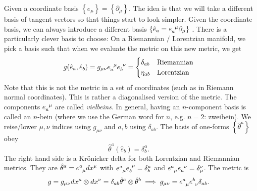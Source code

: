 Given a coordinate basis $\left\{ e_{\mu} \right\} = \left\{ \partial_{\mu} \right\}$.
The idea is that we will take a different basis of tangent vectors so that things start to look simpler.
Given the coordinate basis, we can always introduce a different basis $\left\{ \hat e_a = e \indices{_a^{\mu}} \partial_{\mu} \right\}$ .
There is a particularly clever basis to choose:
On a Riemannian / Lorentzian manifold, we pick a basis such that when we evaluate the metric on this new metric, we get
\begin{equation}
  g(\hat e_a, \hat e_b) = g_{\mu\nu} e\indices{_a^{\mu}} e \indices{_b^{\nu}} =
  \begin{cases}
    \delta_{ab} & \text{Riemannian} \\
    \eta_{ab} & \text{Lorentzian}
  \end{cases}
\end{equation}
Note that this is not the metric in a set of coordinates (such as in Riemann normal coordinates). This is rather a diagonalised version of the metric.
The components $e \indices{_a^{\mu}}$ are called \emph{vielbeins}.
In general, having an $n$-component basis is called an $n$-bein (where we use the German word for $n$, e.g. $n=2$: zweibein).
We reise/lower $\mu, \nu$ indices using $g_{\mu\nu}$ and $a, b$ using $\delta_{ab}$.
The basis of one-forms $\left\{ \hat\theta^a \right\}$ obey 
\begin{equation}
  \hat \theta^a (\hat e_b) = \delta^a_b.
\end{equation}
The right hand side is a Krönicker delta for both Lorentzian and Riemannian metrics.
They are $\hat \theta^a = e \indices{^a_{\mu}} dx^{\mu}$ with $e \indices{^a_{\mu}} e \indices{_b^{\mu}} = \delta^a_b$ and $e \indices{^a_{\mu}} e \indices{_a^{\nu}} = \delta^{\nu}_{\mu}$. The metric is
\begin{equation}
  g = g_{\mu\nu} dx^{\mu} \otimes dx^{\nu} = \delta_{ab} \hat \theta^a \otimes \hat\theta^b \implies g_{\mu\nu} = e \indices{^a_{\mu}} e \indices{^b_{\nu}} \delta_{ab}.
\end{equation}

